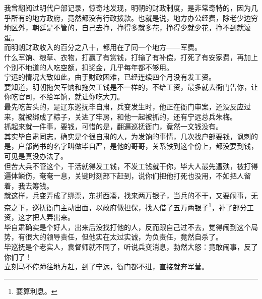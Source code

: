 \begin{multicols}{\theparacolNo}
我曾翻阅过明代户部记录，惊奇地发现，明朝的财政制度，是非常奇特的，因为几乎所有的地方政府，竟然都没有行政拨款。也就是说，地方办公经费，除老少边穷地区外，朝廷是不管的，自己去挣，挣得多就多花，挣得少就少花，挣不到就滚蛋。\\

而明朝财政收入的百分之八十，都用在了同一个地方——军费。\\

什么军饷、粮草、衣物，打赢了有赏钱，打输了有补偿，打死了有安家费，再加上个别不地道的人吃空额，扣奖金，几乎每年都不够用。\\

宁远的情况大致如此，由于财政困难，已经连续四个月没有发工资。\\

要知道，明朝拖欠军饷和拖欠工钱是不一样的，不给工资，最多就去衙门告你，让你吃官司，不给军饷，就让你吃大刀。\\

最先吃苦头的，是辽东巡抚毕自肃，兵变发生时，他正在衙门审案，还没反应过来，就被绑成了粽子，关进了牢房，和他一起被抓的，还有宁远总兵朱梅。\\

抓起来就一件事，要钱，可惜的是，翻遍巡抚衙门，竟然一文钱没有。\\

其实毕自肃同志，确实是个很自肃的人，为发饷的事情，几次找户部要钱，讽刺的是，户部尚书的名字叫做毕自严，是他的哥哥，关系铁到这个份上，都没要到钱，可见是真没办法了。\\

但苦大兵不管这个，干活就得发工钱，不发工钱就干你，毕大人最先遭殃，被打得遍体鳞伤，奄奄一息，关键时刻部下赶到，说你们把他打死也没用，不如把人留着，我去筹钱。\\

就这样，兵变弄成了绑票，东拼西凑，找来两万银子，当兵的不干，又要闹事，无奈之下，巡抚衙门主动出面，以政府做担保，找人借了五万两银子\footnote{要算利息。}，补了部分工资，这才把人弄出来。\\

毕自肃确实是个好人，出来后没找打他的人，反而跟自己过不去，觉得闹到这个局势，有很大的领导责任，但他实在太过实诚，为负责任，竟然自杀了。\\

毕巡抚是个老实人，袁督师就不同了，听说兵变消息，勃然大怒：竟敢闹事，反了你们了！\\

立刻马不停蹄往地方赶，到了宁远，衙门都不进，直接就奔军营。\\


\end{multicols}
